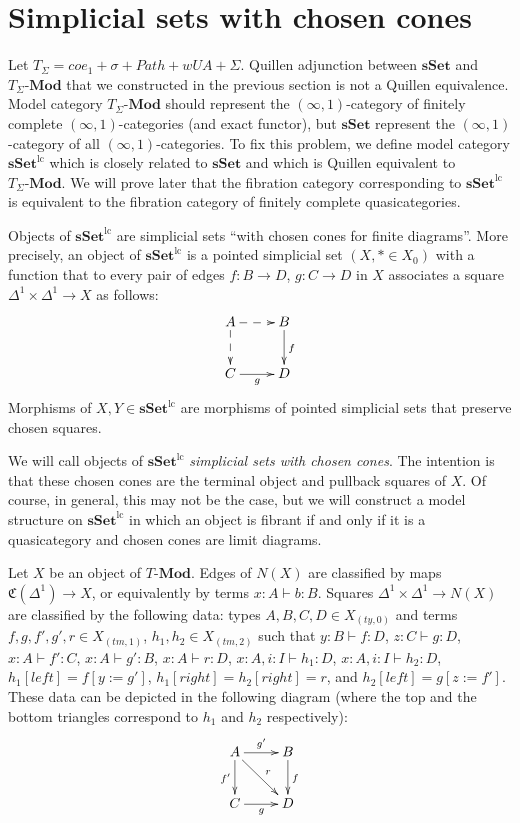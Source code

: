\documentclass[reqno]{amsart}
\theoremstyle{definition}
\theoremstyle{remark}
\newcommand{\repl}{:=}
\newcommand{\cat}[1]{\mathbf{#1}}
\newcommand{\Mod}[1]{#1\text{-}\cat{Mod}}
\newcommand{\sSet}{\cat{sSet}}
\newcommand{\lcsSet}{\sSet^{\mathrm{lc}}}
\numberwithin{figure}{section}
\begin{document}
\section{Simplicial sets with chosen cones}

Let $T_\Sigma = coe_1 + \sigma + Path + wUA + \Sigma$.
Quillen adjunction between $\sSet$ and $\Mod{T_\Sigma}$ that we constructed in the previous section is not a Quillen equivalence.
Model category $\Mod{T_\Sigma}$ should represent the $(\infty,1)$-category of finitely complete $(\infty,1)$-categories (and exact functor),
but $\sSet$ represent the $(\infty,1)$-category of all $(\infty,1)$-categories.
To fix this problem, we define model category $\lcsSet$ which is closely related to $\sSet$ and which is Quillen equivalent to $\Mod{T_\Sigma}$.
We will prove later that the fibration category corresponding to $\lcsSet$ is equivalent to the fibration category of finitely complete quasicategories.

Objects of $\lcsSet$ are simplicial sets ``with chosen cones for finite diagrams''.
More precisely, an object of $\lcsSet$ is a pointed simplicial set $(X, * \in X_0)$ with a function that to every pair of edges $f : B \to D$, $g : C \to D$ in $X$ associates a square $\Delta^1 \times \Delta^1 \to X$ as follows:
\[ \xymatrix{ A \ar@{-->}[r] \ar@{-->}[d] & B \ar[d]^f \\
              C \ar[r]_g & D
            } \]
Morphisms of $X,Y \in \lcsSet$ are morphisms of pointed simplicial sets that preserve chosen squares.

We will call objects of $\lcsSet$ \emph{simplicial sets with chosen cones}.
The intention is that these chosen cones are the terminal object and pullback squares of $X$.
Of course, in general, this may not be the case, but we will construct a model structure on $\lcsSet$ in which an object is fibrant if and only if it is a quasicategory and chosen cones are limit diagrams.

Let $X$ be an object of $\Mod{T}$.
Edges of $N(X)$ are classified by maps $\mathfrak{C}(\Delta^1) \to X$, or equivalently by terms $x : A \vdash b : B$.
Squares $\Delta^1 \times \Delta^1 \to N(X)$ are classified by the following data:
types $A,B,C,D \in X_{(ty,0)}$ and terms $f,g,f',g',r \in X_{(tm,1)}$, $h_1,h_2 \in X_{(tm,2)}$ such that $y : B \vdash f : D$, $z : C \vdash g : D$, $x : A \vdash f' : C$, $x : A \vdash g' : B$, $x : A \vdash r : D$,
$x : A, i : I \vdash h_1 : D$, $x : A, i : I \vdash h_2 : D$, $h_1[left] = f[y \repl g']$, $h_1[right] = h_2[right] = r$, and $h_2[left] = g[z \repl f']$.
These data can be depicted in the following diagram (where the top and the bottom triangles correspond to $h_1$ and $h_2$ respectively):
\[ \xymatrix{ A \ar[r]^{g'} \ar[d]_{f'} \ar[rd]^r & B \ar[d]^f \\
              C \ar[r]_g & D
            } \]
\end{document}
